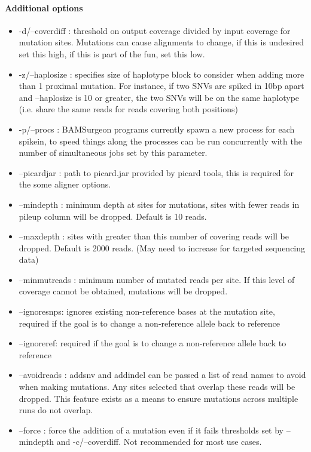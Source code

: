 \documentclass[letterpaper,11pt]{article}
\begin{document}
\paragraph{Additional options}
\begin{itemize}
\item -d/--coverdiff : threshold on output coverage divided by input coverage for mutation sites. Mutations can cause alignments to change, if this is undesired set this high, if this is part of the fun, set this low.
\item -z/--haplosize : specifies size of haplotype block to consider when adding more than 1 proximal mutation. For instance, if two SNVs are spiked in 10bp apart and --haplosize is 10 or greater, the two SNVs will be on the same haplotype (i.e. share the same reads for reads covering both positions)
\item -p/--procs : BAMSurgeon programs currently spawn a new process for each spikein, to speed things along the processes can be run concurrently with the number of simultaneous jobs set by this parameter.
\item --picardjar : path to picard.jar provided by picard tools, this is required for the some aligner options.
\item --mindepth : minimum depth at sites for mutations, sites with fewer reads in pileup column will be dropped. Default is 10 reads.
\item --maxdepth : sites with greater than this number of covering reads will be dropped. Default is 2000 reads. (May need to increase for targeted sequencing data)
\item --minmutreads : minimum number of mutated reads per site. If this level of coverage cannot be obtained, mutations will be dropped.
\item --ignoresnps: ignores existing non-reference bases at the mutation site, required if the goal is to change a non-reference allele back to reference
\item --ignoreref: required if the goal is to change a non-reference allele back to reference
\item --avoidreads : addsnv and addindel can be passed a list of read names to avoid when making mutations. Any sites selected that overlap these reads will be dropped. This feature exists as a means to ensure mutations across multiple runs do not overlap.
\item --force : force the addition of a mutation even if it fails thresholds set by --mindepth and -c/--coverdiff. Not recommended for most use cases.

\end{itemize}
\end{document}
